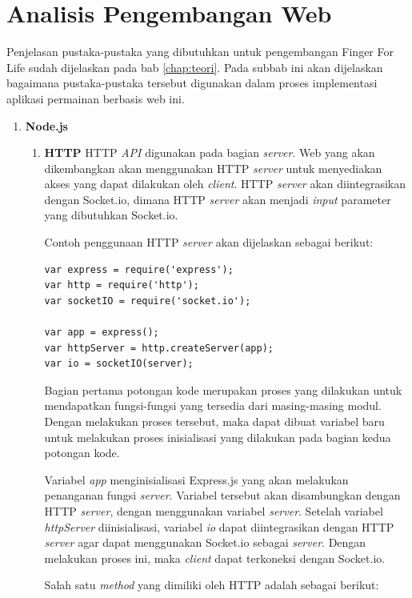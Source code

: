 \section{Analisis Pengembangan Web}
\label{pengembangan}

Penjelasan pustaka-pustaka yang dibutuhkan untuk pengembangan Finger For Life sudah dijelaskan pada bab \ref{chap:teori}. Pada subbab ini akan dijelaskan bagaimana pustaka-pustaka tersebut digunakan dalam proses implementasi aplikasi permainan berbasis web ini.

\begin{enumerate}
	\item \textbf{Node.js} \\
	\begin{enumerate}
		\item \textbf{HTTP}
		HTTP \textit{API} digunakan pada bagian \textit{server}. Web yang akan dikembangkan akan menggunakan HTTP \textit{server} untuk menyediakan akses yang dapat dilakukan oleh \textit{client}. HTTP \textit{server} akan diintegrasikan dengan Socket.io, dimana HTTP \textit{server} akan menjadi \textit{input} parameter yang dibutuhkan Socket.io.
		
		Contoh penggunaan HTTP \textit{server} akan dijelaskan sebagai berikut:
\begin{lstlisting}
var express = require('express');
var http = require('http');
var socketIO = require('socket.io');

var app = express();
var httpServer = http.createServer(app);
var io = socketIO(server);
\end{lstlisting}

Bagian pertama potongan kode merupakan proses yang dilakukan untuk mendapatkan fungsi-fungsi yang tersedia dari masing-masing modul. Dengan melakukan proses tersebut, maka dapat dibuat variabel baru untuk melakukan proses inisialisasi yang dilakukan pada bagian kedua potongan kode.

Variabel \textit{app} menginisialisasi Express.js yang akan melakukan penanganan fungsi \textit{server}. Variabel tersebut akan disambungkan dengan HTTP \textit{server}, dengan menggunakan variabel \textit{server}. Setelah variabel \textit{httpServer} diinisialisasi, variabel \textit{io} dapat diintegrasikan dengan HTTP \textit{server} agar dapat menggunakan Socket.io sebagai \textit{server}. Dengan melakukan proses ini, maka \textit{client} dapat terkoneksi dengan Socket.io.
		
		Salah satu \textit{method} yang dimiliki oleh HTTP adalah sebagai berikut:
		

\end{enumerate}
\end{enumerate}
